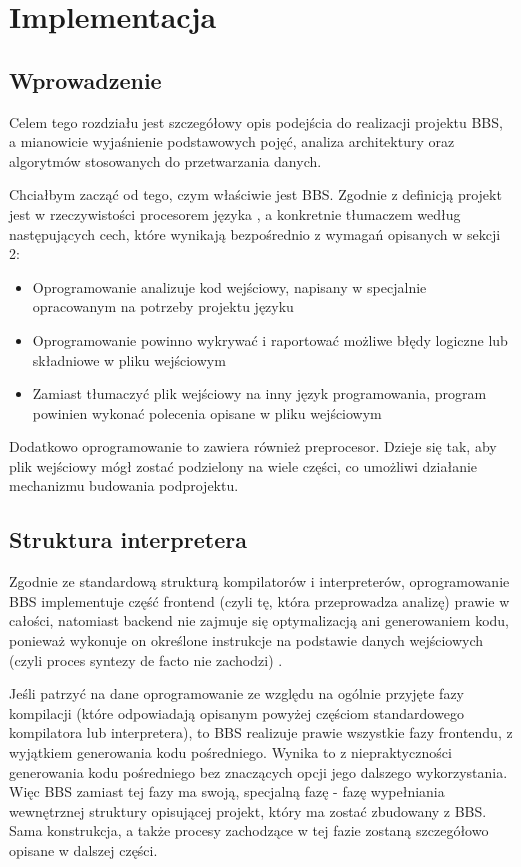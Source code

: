 \chapter{Implementacja}
\section{Wprowadzenie}
Celem tego rozdziału jest szczegółowy opis podejścia do realizacji projektu BBS, a mianowicie wyjaśnienie podstawowych pojęć, analiza architektury oraz algorytmów stosowanych do przetwarzania danych.

Chciałbym zacząć od tego, czym właściwie jest BBS. Zgodnie z definicją projekt jest w rzeczywistości procesorem języka \cite{compilers}, a konkretnie tłumaczem według następujących cech, które wynikają bezpośrednio z wymagań opisanych w sekcji 2:
\begin{itemize}
    \item Oprogramowanie analizuje kod wejściowy, napisany w specjalnie opracowanym na potrzeby projektu języku
    \item Oprogramowanie powinno wykrywać i raportować możliwe błędy logiczne lub składniowe w pliku wejściowym
    \item Zamiast tłumaczyć plik wejściowy na inny język programowania, program powinien wykonać polecenia opisane w pliku wejściowym
\end{itemize}

Dodatkowo oprogramowanie to zawiera również preprocesor. Dzieje się tak, aby plik wejściowy mógł zostać podzielony na wiele części, co umożliwi działanie mechanizmu budowania podprojektu.

\section{Struktura interpretera}
Zgodnie ze standardową strukturą kompilatorów i interpreterów, oprogramowanie BBS implementuje część frontend (czyli tę, która przeprowadza analizę) prawie w całości, natomiast backend nie zajmuje się optymalizacją ani generowaniem kodu, ponieważ wykonuje on określone instrukcje na podstawie danych wejściowych (czyli proces syntezy de facto nie zachodzi) \cite{compilers}.

Jeśli patrzyć na dane oprogramowanie ze względu na ogólnie przyjęte fazy kompilacji (które odpowiadają opisanym powyżej częściom standardowego kompilatora lub interpretera), to BBS realizuje prawie wszystkie fazy frontendu, z wyjątkiem generowania kodu pośredniego. Wynika to z niepraktyczności generowania kodu pośredniego bez znaczących opcji jego dalszego wykorzystania. Więc BBS zamiast tej fazy ma swoją, specjalną fazę - fazę wypełniania wewnętrznej struktury opisującej projekt, który ma zostać zbudowany z BBS. Sama konstrukcja, a także procesy zachodzące w tej fazie zostaną szczegółowo opisane w dalszej części.

